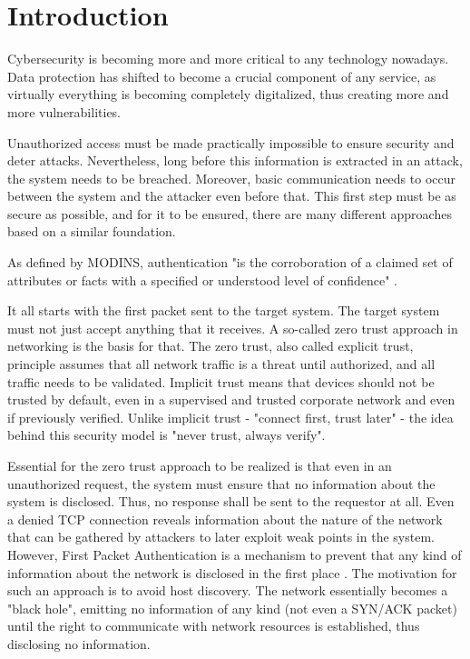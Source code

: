 \section{Introduction}
\label{sec:introduction}

Cybersecurity is becoming more and more critical to any technology nowadays.  Data protection has shifted to become a crucial component of any service, as virtually everything is becoming completely digitalized, thus creating more and more vulnerabilities.\par

Unauthorized access must be made practically impossible to ensure security and deter attacks.  Nevertheless, long before this information is extracted in an attack, the system needs to be breached.  Moreover, basic communication needs to occur between the system and the attacker even before that.  This first step must be as secure as possible, and for it to be ensured, there are many different approaches based on a similar foundation.\\\par

As defined by MODINS, authentication "is the corroboration of a claimed set of attributes or facts with a specified or understood level of confidence" \cite{modins}. \par

It all starts with the first packet sent to the target system.  The target system must not just accept anything that it receives.  A so-called zero trust approach in networking is the basis for that.  The zero trust, also called explicit trust, principle assumes that all network traffic is a threat until authorized, and all traffic needs to be validated.  Implicit trust means that devices should not be trusted by default, even in a supervised and trusted corporate network and even if previously verified.  Unlike implicit trust - "connect first, trust later" - the idea behind this security model is "never trust, always verify".\par

Essential for the zero trust approach to be realized is that even in an unauthorized request, the system must ensure that no information about the system is disclosed.  Thus, no response shall be sent to the requestor at all.  Even a denied TCP connection reveals information about the nature of the network that can be gathered by attackers to later exploit weak points in the system.  However, First Packet Authentication is a mechanism to prevent that any kind of information about the network is disclosed in the first place \cite{7796146}.  The motivation for such an approach is to avoid host discovery.  The network essentially becomes a "black hole", emitting no information of any kind (not even a SYN/ACK packet) until the right to communicate with network resources is established, thus disclosing no information.\\\par

